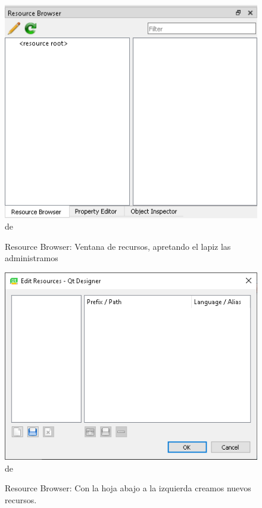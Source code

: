 \begin{figure}[H]
    \centering
    \includegraphics[scale=0.7]{imagenes/qtdesigner/qt_resource_browser_0.PNG}de
    \caption{Resource Browser: Ventana de recursos, apretando el lapiz las administramos}
    \label{fig:qt_resources_0}
\end{figure}

\begin{figure}[H]
    \centering
    \includegraphics[scale=0.7]{imagenes/qtdesigner/qt_resource_browser_1.PNG}de
    \caption{Resource Browser: Con la hoja abajo a la izquierda creamos nuevos recursos.}
    \label{fig:qt_resources_1}
\end{figure}


